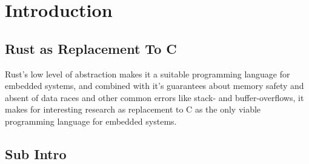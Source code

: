 
\section{Introduction}
\label{chap:intro}

\subsection{Rust as Replacement To C} %
\label{sub:rust_as_replacement_to_c}


Rust's low level of abstraction makes it a suitable programming language for embedded systems, and
combined with it's guarantees about memory safety and absent of data races and other common errors
like stack- and buffer-overflows, it makes for interesting research as replacement to C as the only
viable programming language for embedded systems.


\subsection{Sub Intro}
\label{chap:intro_sub}

